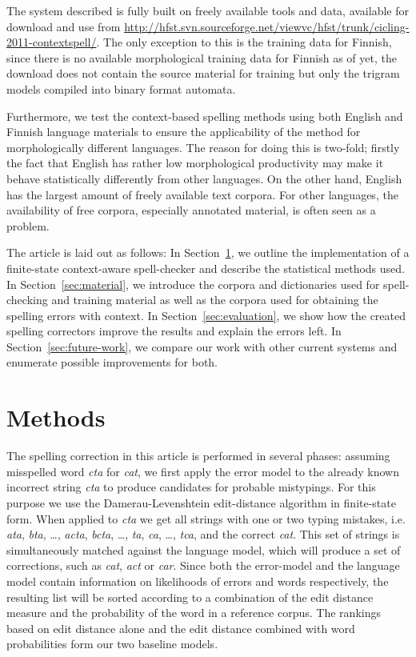 \documentclass{llncs}
\begin{document}
The system described is fully built on freely available tools and data,
available for download and use from 
\url{http://hfst.svn.sourceforge.net/viewvc/hfst/trunk/cicling-2011-contextspell/}.
The only exception to this is the training data for Finnish, since there is no
available morphological training data for Finnish as of yet, the download does
not contain the source material for training but only the trigram models
compiled into binary format automata.

Furthermore, we test the context-based spelling methods using both English and
Finnish language materials to ensure the applicability of the method for
morphologically different languages. The reason for doing this is two-fold;
firstly the fact that English has rather low morphological productivity may
make it behave statistically differently from other languages. On the other
hand, English has the largest amount of freely available text corpora. For
other languages, the availability of free corpora, especially annotated
material, is often seen as a problem.

The article is laid out as follows: In Section~\ref{sec:methods}, we outline
the implementation of a finite-state context-aware spell-checker and describe
the statistical methods used.  In Section~\ref{sec:material}, we introduce the
corpora and dictionaries used for spell-checking and training material as well
as the corpora used for obtaining the spelling errors with context. In
Section~\ref{sec:evaluation}, we show how the created spelling correctors
improve the results and explain the errors left. In
Section~\ref{sec:future-work}, we compare our work with other current systems
and enumerate possible improvements for both.

\section{Methods}
\label{sec:methods}

The spelling correction in this article is performed in several phases:
assuming misspelled word \emph{cta} for \emph{cat}, we first apply the error
model to the already known incorrect string \emph{cta} to produce candidates
for probable mistypings. For this purpose we use the Damerau-Levenshtein
edit-distance algorithm in finite-state form. When applied to \emph{cta} we get
all strings with one or two typing mistakes, i.e. \emph{ata}, \emph{bta},
\ldots, \emph{acta}, \emph{bcta}, \ldots, \emph{ta}, \emph{ca}, \ldots,
\emph{tca}, and the correct \emph{cat}. This set of strings is simultaneously
matched against the language model, which will produce a set of corrections,
such as \emph{cat}, \emph{act} or \emph{car}. Since both the error-model and
the language model contain information on likelihoods of errors and words
respectively, the resulting list will be sorted according to a combination of
the edit distance measure and the probability of the word in a reference
corpus.  The rankings based on edit distance alone and the edit distance
combined with word probabilities form our two baseline models. 
\end{document}
